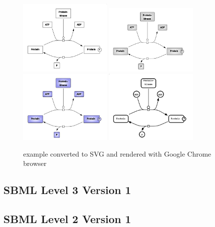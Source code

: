 \begin{figure}[!ht]
\begin{center}
\includegraphics[width=0.4\textwidth]{figures/Phosphorylation_wireFrame}
\includegraphics[width=0.4\textwidth]{figures/Phosphorylation_gray}
\includegraphics[width=0.4\textwidth]{figures/Phosphorylation_color}
\includegraphics[width=0.4\textwidth]{figures/Phosphorylation_SBGN}
\end{center}
\caption{example converted to SVG and rendered with Google Chrome browser}
\label{ExampleRendering}
\end{figure}



\subsection*{SBML Level 3 Version 1}


\subsection*{SBML Level 2 Version 1}






